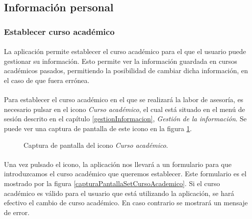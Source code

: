 \subsection{Información personal}

  \subsubsection{Establecer curso académico}

  \paragraph{}La aplicación permite establecer el curso académico para el que
  el usuario puede gestionar su información. Esto permite ver la información
  guardada en cursos académicos pasados, permitiendo la posibilidad de cambiar
  dicha información, en el caso de que fuera errónea.

  \paragraph{}Para establecer el curso académico en el que se realizará la labor
  de asesoría, es necesario pulsar en el icono \textit{Curso académico}, el cual
  está situado en el menú de sesión descrito en el capítulo
  \ref{gestionInformacion}, \textit{Gestión de la información}. Se puede ver una
  captura de pantalla de este icono en la figura
  \ref{capturaPantallaIconoCursoAcademico}.

  \begin{figure}[!ht]
    \begin{center}
      \caption{Captura de pantalla del icono \textit{Curso académico}.}
      \label{capturaPantallaIconoCursoAcademico}
    \end{center}
  \end{figure}

  \paragraph{}Una vez pulsado el icono, la aplicación nos llevará a un
  formulario para que introduzcamos el curso académico que queremos establecer.
  Este formulario es el mostrado por la figura
  \ref{capturaPantallaSetCursoAcademico}. Si el curso académico es válido para
  el usuario que está utilizando la aplicación, se hará efectivo el cambio de
  curso académico. En caso contrario se mostrará un mensaje de error.

